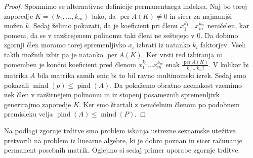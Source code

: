\documentclass[12pt,a4paper,twoside]{article}
\theoremstyle{definition} %
\theoremstyle{plain} %
\numberwithin{equation}{section}  %
\DeclareMathOperator{\per}{per}
\DeclareMathOperator{\mind}{mind}
\DeclareMathOperator{\pind}{pind}
\begin{document}
\begin{proof}
Spomnimo se alternativne definicije permanentnega indeksa. Naj bo torej zaporedje $K = (k_1, \ldots, k_m)$ tako, da $\per A(K) \neq 0$ in sicer za najmanjši možen $k$. Sedaj želimo pokazati, da je koeficient pri členu $x_1^{k_1}\ldots x_m^{k_m}$ neničelen, kar pomeni, da se v razširejenem polinomu taki členi ne seštejejo v $0$. Da dobimo zgornji člen moramo torej spremenljivko $x_i$ izbrati iz natanko $k_i$ faktorjev. Vseh takih možnih izbir pa je natanko $\per A(K)$. Ker vrsti red izbiranja ni pomemben je končni koeficient pred členom  $x_1^{k_1}\ldots x_m^{k_m}$ enak $\frac{\per A(K)}{k_1!\ldots k_m!}$. V kolikor bi matrika $A$ bila matrika samih enic bi to bil ravno multinomski izrek. Sedaj smo pokazali $\mind(p) \le \pind(A)$. Da pokažemo obratno neenakost vzemimo nek člen v razširnejem polinomu in iz stopenj posameznih spremenljivk generirajmo zaporedje $K$. Ker smo štartali z neničelnim členom po podobnem premisleku velja $\pind(A) \le \mind(P)$.
\end{proof}
Na podlagi zgornje trditve smo problem iskanja ustrezne seznamske utežitve pretvorili na problem iz linearne algebre, ki je dobro poznan in sicer računanje permanent posebnih matrik. Oglejmo si sedaj primer uporabe zgornje trditve.
\end{document}
